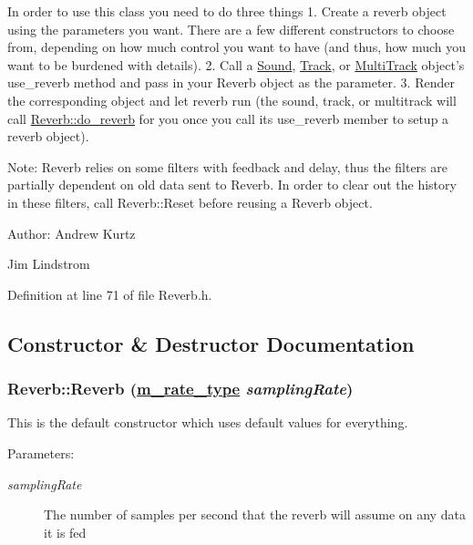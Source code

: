 In order to use this class you need to do three things 1. Create a reverb object using the parameters you want. There are a few different constructors to choose from, depending on how much control you want to have (and thus, how much you want to be burdened with details). 2. Call a \hyperlink{classSound}{Sound}, \hyperlink{classTrack}{Track}, or \hyperlink{classMultiTrack}{Multi\-Track} object's use\_\-reverb method and pass in your Reverb object as the parameter. 3. Render the corresponding object and let reverb run (the sound, track, or multitrack will call \hyperlink{classReverb_a6}{Reverb::do\_\-reverb} for you once you call its use\_\-reverb member to setup a reverb object).

\begin{Desc}
\item[Note:]Reverb relies on some filters with feedback and delay, thus the filters are partially dependent on old data sent to Reverb. In order to clear out the history in these filters, call Reverb::Reset before reusing a Reverb object.\end{Desc}
\begin{Desc}
\item[Author:]Andrew Kurtz 

Jim Lindstrom \end{Desc}




Definition at line 71 of file Reverb.h.

\subsection{Constructor \& Destructor Documentation}
\hypertarget{classReverb_a0}{
\subsubsection[Reverb]{\setlength{\rightskip}{0pt plus 5cm}Reverb::Reverb (\hyperlink{Types_8h_a4}{m\_\-rate\_\-type} {\em sampling\-Rate})}}
\label{classReverb_a0}


This is the default constructor which uses default values for everything. \begin{Desc}
\item[Parameters:]
\begin{description}
\item[{\em sampling\-Rate}]The number of samples per second that the reverb will assume on any data it is fed \end{description}
\end{Desc}


